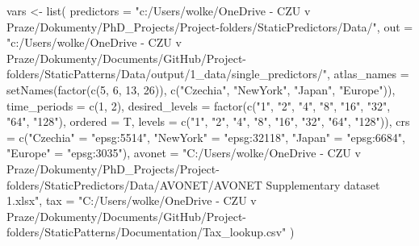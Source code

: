 \documentclass[
  letterpaper,
  DIV=11,
  numbers=noendperiod]{scrreprt}
\newenvironment{Shaded}{\begin{snugshade}}{\end{snugshade}}
\newcommand{\AttributeTok}[1]{\textcolor[rgb]{0.40,0.45,0.13}{#1}}
\newcommand{\DecValTok}[1]{\textcolor[rgb]{0.68,0.00,0.00}{#1}}
\newcommand{\FunctionTok}[1]{\textcolor[rgb]{0.28,0.35,0.67}{#1}}
\newcommand{\NormalTok}[1]{\textcolor[rgb]{0.00,0.23,0.31}{#1}}
\newcommand{\OtherTok}[1]{\textcolor[rgb]{0.00,0.23,0.31}{#1}}
\newcommand{\StringTok}[1]{\textcolor[rgb]{0.13,0.47,0.30}{#1}}
\begin{document}
\begin{Shaded}
\begin{Highlighting}[]
\NormalTok{vars }\OtherTok{\textless{}{-}} \FunctionTok{list}\NormalTok{(}
  \AttributeTok{predictors =}
    \StringTok{"c:/Users/wolke/OneDrive {-} CZU v Praze/Dokumenty/PhD\_Projects/Project{-}folders/StaticPredictors/Data/"}\NormalTok{,}
  \AttributeTok{out =}
    \StringTok{"c:/Users/wolke/OneDrive {-} CZU v Praze/Dokumenty/Documents/GitHub/Project{-}folders/StaticPatterns/Data/output/1\_data/single\_predictors/"}\NormalTok{,}
  \AttributeTok{atlas\_names =} \FunctionTok{setNames}\NormalTok{(}\FunctionTok{factor}\NormalTok{(}\FunctionTok{c}\NormalTok{(}\DecValTok{5}\NormalTok{, }\DecValTok{6}\NormalTok{, }\DecValTok{13}\NormalTok{, }\DecValTok{26}\NormalTok{)), }
                         \FunctionTok{c}\NormalTok{(}\StringTok{"Czechia"}\NormalTok{, }\StringTok{"NewYork"}\NormalTok{, }\StringTok{"Japan"}\NormalTok{, }\StringTok{"Europe"}\NormalTok{)),}
  \AttributeTok{time\_periods =} \FunctionTok{c}\NormalTok{(}\DecValTok{1}\NormalTok{, }\DecValTok{2}\NormalTok{),}
  \AttributeTok{desired\_levels =} \FunctionTok{factor}\NormalTok{(}\FunctionTok{c}\NormalTok{(}\StringTok{"1"}\NormalTok{, }\StringTok{"2"}\NormalTok{, }\StringTok{"4"}\NormalTok{, }\StringTok{"8"}\NormalTok{, }\StringTok{"16"}\NormalTok{, }\StringTok{"32"}\NormalTok{, }\StringTok{"64"}\NormalTok{, }\StringTok{"128"}\NormalTok{), }
                          \AttributeTok{ordered =}\NormalTok{ T, }
                          \AttributeTok{levels =} \FunctionTok{c}\NormalTok{(}\StringTok{"1"}\NormalTok{, }\StringTok{"2"}\NormalTok{, }\StringTok{"4"}\NormalTok{, }\StringTok{"8"}\NormalTok{, }\StringTok{"16"}\NormalTok{, }\StringTok{"32"}\NormalTok{, }\StringTok{"64"}\NormalTok{, }\StringTok{"128"}\NormalTok{)),}
  \AttributeTok{crs =} \FunctionTok{c}\NormalTok{(}\StringTok{"Czechia"} \OtherTok{=} \StringTok{"epsg:5514"}\NormalTok{, }
          \StringTok{"NewYork"} \OtherTok{=} \StringTok{"epsg:32118"}\NormalTok{, }
          \StringTok{"Japan"} \OtherTok{=} \StringTok{"epsg:6684"}\NormalTok{, }
          \StringTok{"Europe"} \OtherTok{=} \StringTok{"epsg:3035"}\NormalTok{),}
  \AttributeTok{avonet =} \StringTok{"C:/Users/wolke/OneDrive {-} CZU v Praze/Dokumenty/PhD\_Projects/Project{-}folders/StaticPredictors/Data/AVONET/AVONET Supplementary dataset 1.xlsx"}\NormalTok{,}
  \AttributeTok{tax =} \StringTok{"C:/Users/wolke/OneDrive {-} CZU v Praze/Dokumenty/Documents/GitHub/Project{-}folders/StaticPatterns/Documentation/Tax\_lookup.csv"}
\NormalTok{)}
\end{Highlighting}
\end{Shaded}
\end{document}

